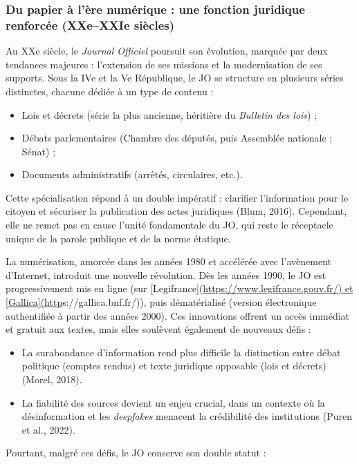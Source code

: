 \subsubsection{Du papier à l’ère numérique : une fonction juridique renforcée (XXe–XXIe siècles)}

Au XXe siècle, le \emph{Journal Officiel} poursuit son évolution, marquée par deux tendances majeures : l’extension de ses missions et la modernisation de ses supports. Sous la IVe et la Ve République, le JO se structure en plusieurs séries distinctes, chacune dédiée à un type de contenu :

\begin{itemize}
\item Lois et décrets (série la plus ancienne, héritière du \emph{Bulletin des lois}) ;
\item Débats parlementaires (Chambre des députés, puis Assemblée nationale ; Sénat) ;
\item Documents administratifs (arrêtés, circulaires, etc.).

\end{itemize}
Cette spécialisation répond à un double impératif : clarifier l’information pour le citoyen et sécuriser la publication des actes juridiques (Blum, 2016). Cependant, elle ne remet pas en cause l’unité fondamentale du JO, qui reste le réceptacle unique de la parole publique et de la norme étatique.

La numérisation, amorcée dans les années 1980 et accélérée avec l’avènement d’Internet, introduit une nouvelle révolution. Dès les années 1990, le JO est progressivement mis en ligne (sur [Legifrance](\url{https://www.legifrance.gouv.fr/) et [Gallica](http}s://gallica.bnf.fr/)), puis dématérialisé (version électronique authentifiée à partir des années 2000). Ces innovations offrent un accès immédiat et gratuit aux textes, mais elles soulèvent également de nouveaux défis :

\begin{itemize}
\item La surabondance d’information rend plus difficile la distinction entre débat politique (comptes rendus) et texte juridique opposable (lois et décrets) (Morel, 2018).
\item La fiabilité des sources devient un enjeu crucial, dans un contexte où la désinformation et les \emph{deepfakes} menacent la crédibilité des institutions (Puren et al., 2022).

\end{itemize}
Pourtant, malgré ces défis, le JO conserve son double statut :

